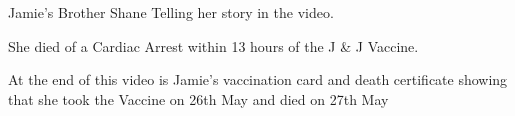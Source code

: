 Jamie’s Brother Shane Telling her story in the video.

She died of a Cardiac Arrest within 13 hours of the J \& J Vaccine.

At the end of this video is Jamie’s vaccination card and death certificate
showing that she took the Vaccine on 26th May and died on 27th May

